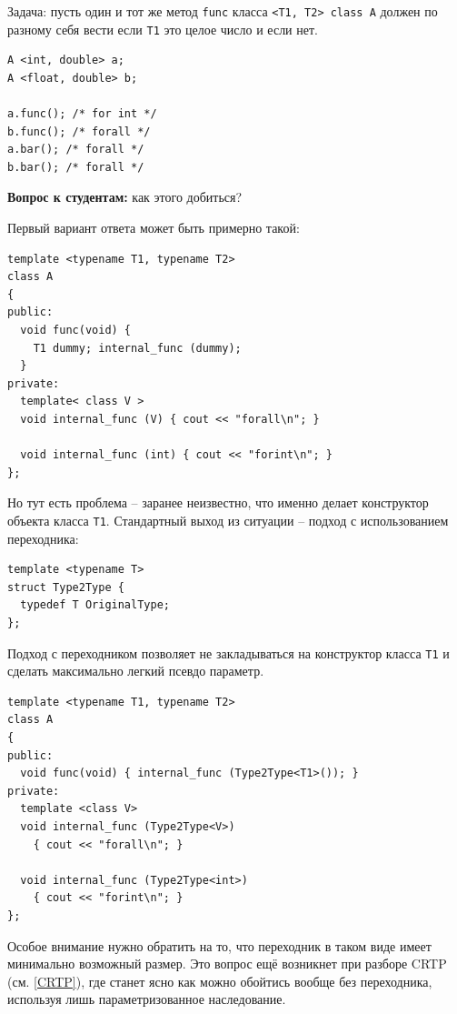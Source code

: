 \documentclass[a4paper,12pt,oneside]{article}
\newif\ifanswers
\begin{document}
Задача: пусть один и тот же метод \lstinline!func! класса \lstinline!<T1, T2> class A! должен по разному себя вести если \lstinline!T1! это целое число и если нет.

\begin{lstlisting}
A <int, double> a;
A <float, double> b;

a.func(); /* for int */
b.func(); /* forall */
a.bar(); /* forall */
b.bar(); /* forall */
\end{lstlisting}

\textbf{Вопрос к студентам:} как этого добиться?

\ifanswers
См. верный ответ ниже (разумеется предполагается немного подумать самому).
\fi

Первый вариант ответа может быть примерно такой:

\begin{lstlisting}
template <typename T1, typename T2>
class A
{
public:
  void func(void) { 
    T1 dummy; internal_func (dummy); 
  }
private:
  template< class V >
  void internal_func (V) { cout << "forall\n"; }

  void internal_func (int) { cout << "forint\n"; }
};
\end{lstlisting}

Но тут есть проблема -- заранее неизвестно, что именно делает конструктор объекта класса \lstinline!T1!. Стандартный выход из ситуации -- подход с использованием переходника: 

\begin{lstlisting}
template <typename T>
struct Type2Type {
  typedef T OriginalType;
};
\end{lstlisting}

Подход с переходником позволяет не закладываться на конструктор класса \lstinline!T1! и сделать максимально легкий псевдо параметр.

\begin{lstlisting}
template <typename T1, typename T2>
class A
{
public:
  void func(void) { internal_func (Type2Type<T1>()); }
private:
  template <class V>
  void internal_func (Type2Type<V>)
    { cout << "forall\n"; }

  void internal_func (Type2Type<int>)
    { cout << "forint\n"; }
};
\end{lstlisting}

Особое внимание нужно обратить на то, что переходник в таком виде имеет минимально возможный размер. Это вопрос ещё возникнет при разборе CRTP (см. \ref{CRTP}), где станет ясно как можно обойтись вообще без переходника, используя лишь параметризованное наследование.
\end{document}
